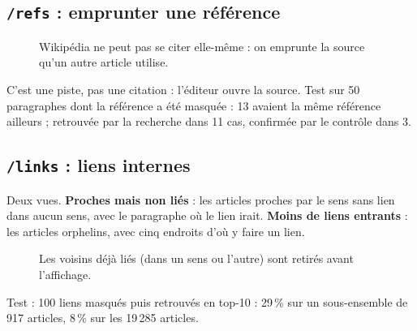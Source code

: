 \documentclass[11pt,a4paper]{article}
\begin{document}
\subsection{\texttt{/refs} : emprunter une référence}
\begin{figure}[H]\centering
{}
\caption{Wikipédia ne peut pas se citer elle-même : on emprunte la source qu'un autre article utilise.}
\end{figure}
C'est une piste, pas une citation : l'éditeur ouvre la source. Test sur 50 paragraphes dont la référence a été masquée : 13 avaient la même référence ailleurs ; retrouvée par la recherche dans 11 cas, confirmée par le contrôle dans 3.

\subsection{\texttt{/links} : liens internes}
Deux vues. \textbf{Proches mais non liés} : les articles proches par le sens sans lien dans aucun sens, avec le paragraphe où le lien irait. \textbf{Moins de liens entrants} : les articles orphelins, avec cinq endroits d'où y faire un lien.

\begin{figure}[H]\centering
{}
\caption{Les voisins déjà liés (dans un sens ou l'autre) sont retirés avant l'affichage.}
\end{figure}
Test : 100 liens masqués puis retrouvés en top-10 : 29\,\% sur un sous-ensemble de 917 articles, 8\,\% sur les 19\,285 articles.
\end{document}
